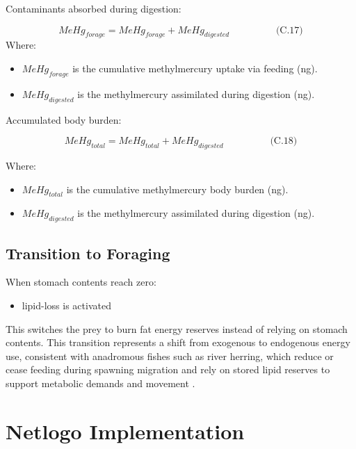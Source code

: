 \documentclass[
]{book}
\providecommand{\tightlist}{%
  \setlength{\itemsep}{0pt}\setlength{\parskip}{0pt}}
\begin{document}
Contaminants absorbed during digestion:

\[
\begin{equation} MeHg_{forage} = MeHg_{forage} + MeHg_{digested}  \hspace{2cm} \text{(C.17)} \end{equation}
\] Where:

\begin{itemize}
\item
  \(MeHg_{forage}\) is the cumulative methylmercury uptake via feeding
  (ng).
\item
  \(MeHg_{digested}\) is the methylmercury assimilated during digestion
  (ng).
\end{itemize}

Accumulated body burden:

\[
\begin{equation} MeHg_{total} = MeHg_{total} + MeHg_{digested}  \hspace{2cm} \text{(C.18)} \end{equation}
\]

Where:

\begin{itemize}
\item
  \(MeHg_{total}\) is the cumulative methylmercury body burden (ng).
\item
  \(MeHg_{digested}\) is the methylmercury assimilated during digestion
  (ng).
\end{itemize}

\subsection{Transition to Foraging}\label{transition-to-foraging}

When stomach contents reach zero:

\begin{itemize}
\tightlist
\item
  lipid-loss is activated
\end{itemize}

This switches the prey to burn fat energy reserves instead of relying on
stomach contents. This transition represents a shift from exogenous to
endogenous energy use, consistent with anadromous fishes such as river
herring, which reduce or cease feeding during spawning migration and
rely on stored lipid reserves to support metabolic demands and movement
\citep{araujo_energetic_2013, zenga_assessing_2020}.

\section{Netlogo Implementation}\label{netlogo-implementation-1}
\end{document}
